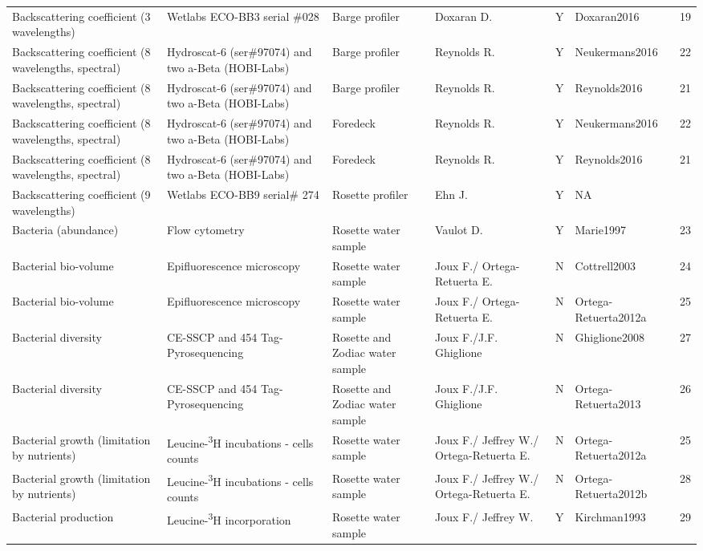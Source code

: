 \begin{ThreePartTable}
\begin{longtable}[t]{lllllll}
\addlinespace
Backscattering coefficient (3 wavelengths) & Wetlabs ECO-BB3 serial \#028 & Barge profiler & Doxaran D. & Y & Doxaran2016 & 19\\
Backscattering coefficient (8 wavelengths, spectral) & Hydroscat-6 (ser\#97074) and two a-Beta (HOBI-Labs) & Barge profiler & Reynolds R. & Y & Neukermans2016 & 22\\
Backscattering coefficient (8 wavelengths, spectral) & Hydroscat-6 (ser\#97074) and two a-Beta (HOBI-Labs) & Barge profiler & Reynolds R. & Y & Reynolds2016 & 21\\
Backscattering coefficient (8 wavelengths, spectral) & Hydroscat-6 (ser\#97074) and two a-Beta (HOBI-Labs) & Foredeck & Reynolds R. & Y & Neukermans2016 & 22\\
Backscattering coefficient (8 wavelengths, spectral) & Hydroscat-6 (ser\#97074) and two a-Beta (HOBI-Labs) & Foredeck & Reynolds R. & Y & Reynolds2016 & 21\\
\addlinespace
Backscattering coefficient (9 wavelengths) & Wetlabs ECO-BB9 serial\# 274 & Rosette profiler & Ehn J. & Y & NA & \\
Bacteria (abundance) & Flow cytometry & Rosette water sample & Vaulot D. & Y & Marie1997 & 23\\
Bacterial bio-volume & Epifluorescence microscopy & Rosette water sample & Joux F./ Ortega-Retuerta E. & N & Cottrell2003 & 24\\
Bacterial bio-volume & Epifluorescence microscopy & Rosette water sample & Joux F./ Ortega-Retuerta E. & N & Ortega-Retuerta2012a & 25\\
Bacterial diversity & CE-SSCP and 454 Tag-Pyrosequencing & Rosette and Zodiac water sample & Joux F./J.F. Ghiglione & N & Ghiglione2008 & 27\\
\addlinespace
Bacterial diversity & CE-SSCP and 454 Tag-Pyrosequencing & Rosette and Zodiac water sample & Joux F./J.F. Ghiglione & N & Ortega-Retuerta2013 & 26\\
Bacterial growth (limitation by nutrients) & Leucine-\textsuperscript{3}H incubations - cells counts & Rosette water sample & Joux F./ Jeffrey W./ Ortega-Retuerta E. & N & Ortega-Retuerta2012a & 25\\
Bacterial growth (limitation by nutrients) & Leucine-\textsuperscript{3}H incubations - cells counts & Rosette water sample & Joux F./ Jeffrey W./ Ortega-Retuerta E. & N & Ortega-Retuerta2012b & 28\\
Bacterial production & Leucine-\textsuperscript{3}H incorporation & Rosette water sample & Joux F./ Jeffrey W. & Y & Kirchman1993 & 29\\

\end{longtable}
\end{ThreePartTable}

